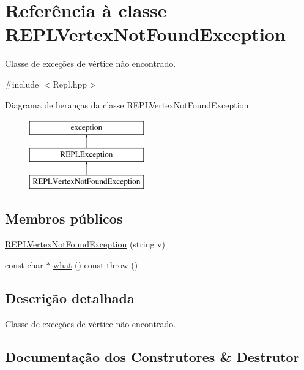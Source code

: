 \hypertarget{classREPLVertexNotFoundException}{}\section{Referência à classe R\+E\+P\+L\+Vertex\+Not\+Found\+Exception}
\label{classREPLVertexNotFoundException}


Classe de exceções de vértice não encontrado.  




{\ttfamily \#include $<$Repl.\+hpp$>$}

Diagrama de heranças da classe R\+E\+P\+L\+Vertex\+Not\+Found\+Exception\begin{figure}[H]
\begin{center}
\leavevmode
\includegraphics[height=3.000000cm]{classREPLVertexNotFoundException}
\end{center}
\end{figure}
\subsection*{Membros públicos}
\begin{DoxyCompactItemize}
\item 
\hyperlink{classREPLVertexNotFoundException_a30fcae3c8ffc5c861cab7474bbf5f658}{R\+E\+P\+L\+Vertex\+Not\+Found\+Exception} (string v)
\item 
const char $\ast$ \hyperlink{classREPLVertexNotFoundException_ab8d189e6c0fcf90c87b4209096c45b53}{what} () const  throw ()
\end{DoxyCompactItemize}


\subsection{Descrição detalhada}
Classe de exceções de vértice não encontrado. 

\subsection{Documentação dos Construtores \& Destrutor}
\mbox{\label{classREPLVertexNotFoundException_a30fcae3c8ffc5c861cab7474bbf5f658}} 
